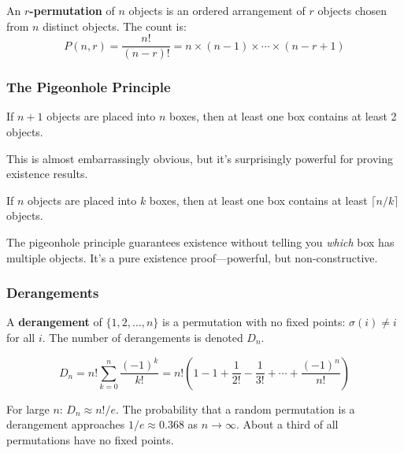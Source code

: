 \begin{definition}[$r$-permutation]
An \textbf{$r$-permutation} of $n$ objects is an ordered arrangement of $r$ objects chosen from $n$ distinct objects. The count is:
\[
P(n, r) = \frac{n!}{(n-r)!} = n \times (n-1) \times \cdots \times (n-r+1)
\]
\end{definition}

\subsubsection*{The Pigeonhole Principle}

\begin{theorem}
If $n + 1$ objects are placed into $n$ boxes, then at least one box contains at least 2 objects.
\end{theorem}

This is almost embarrassingly obvious, but it's surprisingly powerful for proving existence results.

\begin{theorem}
If $n$ objects are placed into $k$ boxes, then at least one box contains at least $\lceil n/k \rceil$ objects.
\end{theorem}

\begin{keyresult}
The pigeonhole principle guarantees existence without telling you \emph{which} box has multiple objects. It's a pure existence proof---powerful, but non-constructive.
\end{keyresult}

\subsubsection*{Derangements}

\begin{definition}[Derangement]
A \textbf{derangement} of $\{1, 2, \ldots, n\}$ is a permutation with no fixed points: $\sigma(i) \neq i$ for all $i$. The number of derangements is denoted $D_n$.
\end{definition}

\begin{theorem}
\[
D_n = n! \sum_{k=0}^{n} \frac{(-1)^k}{k!} = n! \left(1 - 1 + \frac{1}{2!} - \frac{1}{3!} + \cdots + \frac{(-1)^n}{n!}\right)
\]
\end{theorem}

\begin{keyresult}
For large $n$: $D_n \approx n!/e$. The probability that a random permutation is a derangement approaches $1/e \approx 0.368$ as $n \to \infty$. About a third of all permutations have no fixed points.
\end{keyresult}


